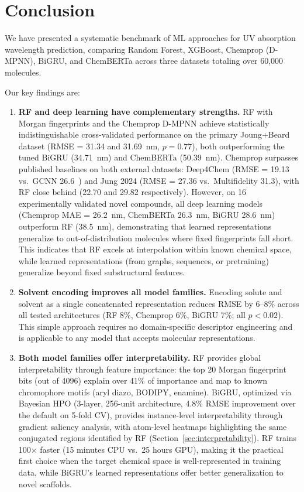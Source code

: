 \documentclass[11pt,a4paper]{article}
\begin{document}
\section{Conclusion}
\label{sec:conclusion}

We have presented a systematic benchmark of ML approaches for UV absorption wavelength prediction, comparing Random Forest, XGBoost, Chemprop (D-MPNN), BiGRU, and ChemBERTa across three datasets totaling over 60,000 molecules.

Our key findings are:

\begin{enumerate}
    \item \textbf{RF and deep learning have complementary strengths.}
    RF with Morgan fingerprints and the Chemprop D-MPNN achieve statistically indistinguishable cross-validated performance on the primary Joung+Beard dataset (RMSE = 31.34 and 31.69~nm, $p = 0.77$), both outperforming the tuned BiGRU (34.71~nm) and ChemBERTa (50.39~nm). Chemprop surpasses published baselines on both external datasets: Deep4Chem (RMSE = 19.13 vs.\ GCNN 26.6~\cite{joung2021deep}) and Jung 2024 (RMSE = 27.36 vs.\ Multifidelity 31.3), with RF close behind (22.70 and 29.82 respectively).
    However, on 16 experimentally validated novel compounds, all deep learning models (Chemprop MAE = 26.2~nm, ChemBERTa 26.3~nm, BiGRU 28.6~nm) outperform RF (38.5~nm), demonstrating that learned representations generalize to out-of-distribution molecules where fixed fingerprints fall short.
    This indicates that RF excels at interpolation within known chemical space, while learned representations (from graphs, sequences, or pretraining) generalize beyond fixed substructural features.

    \item \textbf{Solvent encoding improves all model families.}
    Encoding solute and solvent as a single concatenated representation reduces RMSE by 6--8\% across all tested architectures (RF 8\%, Chemprop 6\%, BiGRU 7\%; all $p < 0.02$).
    This simple approach requires no domain-specific descriptor engineering and is applicable to any model that accepts molecular representations.

    \item \textbf{Both model families offer interpretability.}
    RF provides global interpretability through feature importance: the top 20 Morgan fingerprint bits (out of 4096) explain over 41\% of importance and map to known chromophore motifs (aryl diazo, BODIPY, enamine).
    BiGRU, optimized via Bayesian HPO (3-layer, 256-unit architecture, 4.8\% RMSE improvement over the default on 5-fold CV), provides instance-level interpretability through gradient saliency analysis, with atom-level heatmaps highlighting the same conjugated regions identified by RF (Section~\ref{sec:interpretability}).
    RF trains 100$\times$ faster (15 minutes CPU vs.\ 25 hours GPU), making it the practical first choice when the target chemical space is well-represented in training data, while BiGRU's learned representations offer better generalization to novel scaffolds.


\end{enumerate}
\end{document}
